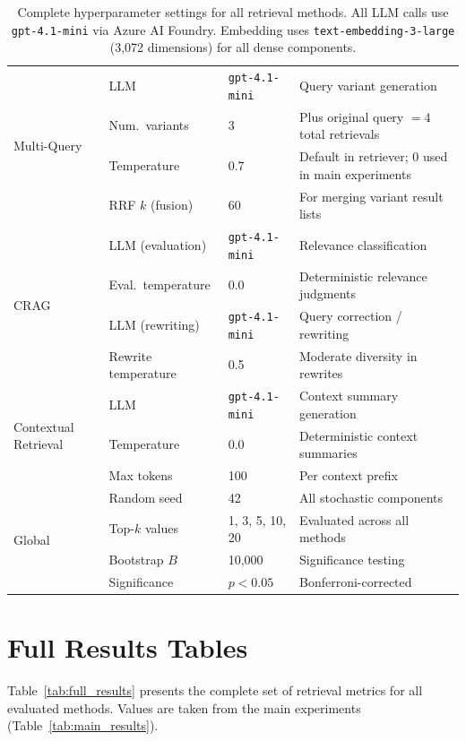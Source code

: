 \documentclass[11pt]{article}
\begin{document}
\begin{table}[ht]
\begin{tabular}{@{}llll@{}}
\midrule
\multirow{4}{*}{Multi-Query}
  & LLM              & \texttt{gpt-4.1-mini} & Query variant generation \\
  & Num.\ variants   & 3     & Plus original query $= 4$ total retrievals \\
  & Temperature      & 0.7   & Default in retriever; 0 used in main experiments \\
  & RRF $k$ (fusion) & 60    & For merging variant result lists \\
\midrule
\multirow{4}{*}{CRAG}
  & LLM (evaluation) & \texttt{gpt-4.1-mini} & Relevance classification \\
  & Eval.\ temperature & 0.0 & Deterministic relevance judgments \\
  & LLM (rewriting)  & \texttt{gpt-4.1-mini} & Query correction / rewriting \\
  & Rewrite temperature & 0.5 & Moderate diversity in rewrites \\
\midrule
\multirow{3}{*}{Contextual Retrieval}
  & LLM              & \texttt{gpt-4.1-mini} & Context summary generation \\
  & Temperature      & 0.0   & Deterministic context summaries \\
  & Max tokens       & 100   & Per context prefix \\
\midrule
\multirow{4}{*}{Global}
  & Random seed      & 42    & All stochastic components \\
  & Top-$k$ values   & 1, 3, 5, 10, 20 & Evaluated across all methods \\
  & Bootstrap $B$    & 10{,}000 & Significance testing \\
  & Significance     & $p < 0.05$ & Bonferroni-corrected \\
\bottomrule
\end{tabular}
\caption{Complete hyperparameter settings for all retrieval methods. All LLM calls use \texttt{gpt-4.1-mini} via Azure AI Foundry. Embedding uses \texttt{text-embedding-3-large} (3,072 dimensions) for all dense components.}
\label{tab:hyperparams}
\end{table}


\section{Full Results Tables}
\label{app:full_results}

Table~\ref{tab:full_results} presents the complete set of retrieval metrics for all evaluated methods. Values are taken from the main experiments (Table~\ref{tab:main_results}).
\end{document}
